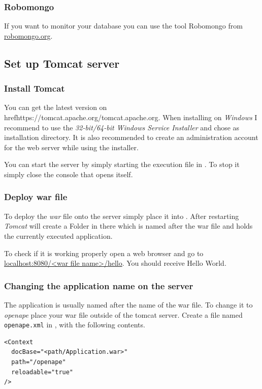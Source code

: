 \documentclass[10pt]{article}
\begin{document}
\subsubsection{Robomongo} If you want to monitor your database you can use the tool Robomongo from \href{https://robomongo.org/}{robomongo.org}.
\subsection{Set up Tomcat server}
\subsubsection{Install Tomcat} You can get the latest version on href{https://tomcat.apache.org/}{tomcat.apache.org}. When installing on \emph{Windows} I recommend to use the \emph{32-bit/64-bit Windows Service Installer} and chose  as installation directory. It is also recommended to create an administration account for the web server while using the installer.

You can start the server by simply starting the execution file in . To stop it simply close the console that opens itself.
\subsubsection{Deploy war file} To deploy the \emph{war} file onto the server simply place it into . After restarting \emph{Tomcat} will create a Folder in there which is named after the war file and holds the currently executed application.

To check if it is working properly open a web browser and go to \href{http://localhost:8080/}{localhost:8080/<war file name>/hello}. You should receive Hello World.
\subsubsection{Changing the application name on the server} The application is usually named after the name of the war file. To change it to \emph{openape} place your war file outside of the tomcat server. Create a file named \texttt{openape.xml} in , with the following contents.
\begin{lstlisting}
<Context 
  docBase="<path/Application.war>" 
  path="/openape" 
  reloadable="true" 
/>
\end{lstlisting}
\end{document}
